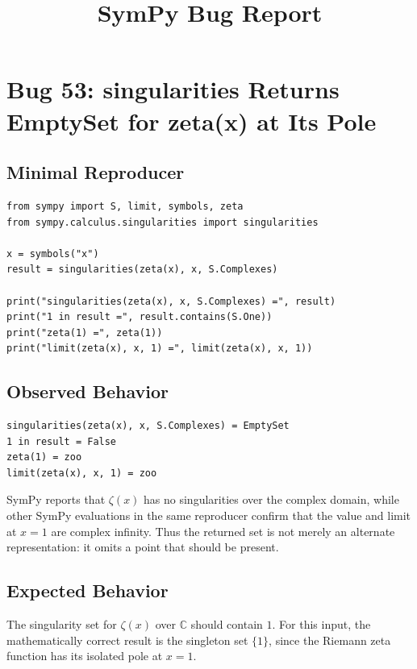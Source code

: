 \documentclass[11pt]{article}
\title{SymPy Bug Report}
\author{}
\date{}
\begin{document}
\maketitle

\section{Bug 53: singularities Returns EmptySet for zeta(x) at Its Pole}

\subsection{Minimal Reproducer}

\medskip

\begin{lstlisting}[style=bugpython]
from sympy import S, limit, symbols, zeta
from sympy.calculus.singularities import singularities

x = symbols("x")
result = singularities(zeta(x), x, S.Complexes)

print("singularities(zeta(x), x, S.Complexes) =", result)
print("1 in result =", result.contains(S.One))
print("zeta(1) =", zeta(1))
print("limit(zeta(x), x, 1) =", limit(zeta(x), x, 1))
\end{lstlisting}

\subsection{Observed Behavior}

\medskip

\begin{lstlisting}[style=bugpython]
singularities(zeta(x), x, S.Complexes) = EmptySet
1 in result = False
zeta(1) = zoo
limit(zeta(x), x, 1) = zoo
\end{lstlisting}

SymPy reports that \(\zeta(x)\) has no singularities over the complex domain, while other SymPy evaluations in the same reproducer confirm that the value and limit at \(x=1\) are complex infinity. Thus the returned set is not merely an alternate representation: it omits a point that should be present.

\subsection{Expected Behavior}

The singularity set for \(\zeta(x)\) over \(\mathbb{C}\) should contain \(1\). For this input, the mathematically correct result is the singleton set \(\{1\}\), since the Riemann zeta function has its isolated pole at \(x=1\).
\end{document}
